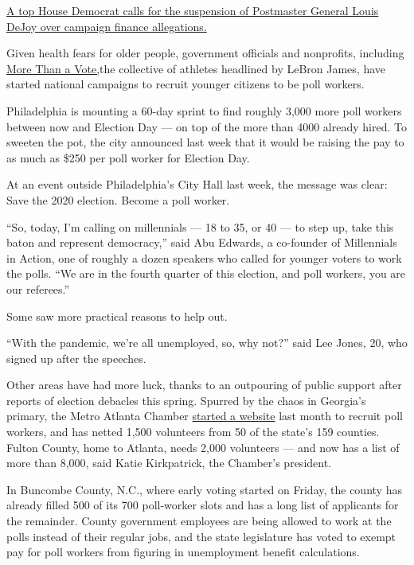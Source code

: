 \href{https://www.nytimes3xbfgragh.onion/live/2020/09/08/us/trump-vs-biden\#a-top-house-democrat-calls-for-the-suspension-of-postmaster-general-louis-dejoy-over-campaign-finance-allegations}{A
top House Democrat calls for the suspension of Postmaster General Louis
DeJoy over campaign finance allegations.}

Given health fears for older people, government officials and
nonprofits, including
\href{https://www.nytimes3xbfgragh.onion/2020/08/24/us/politics/lebron-james-poll-workers.html?searchResultPosition=9}{More
Than a Vote,}the collective of athletes headlined by LeBron James, have
started national campaigns to recruit younger citizens to be poll
workers.

Philadelphia is mounting a 60-day sprint to find roughly 3,000 more poll
workers between now and Election Day --- on top of the more than 4000
already hired. To sweeten the pot, the city announced last week that it
would be raising the pay to as much as \$250 per poll worker for
Election Day.

At an event outside Philadelphia's City Hall last week, the message was
clear: Save the 2020 election. Become a poll worker.

``So, today, I'm calling on millennials --- 18 to 35, or 40 --- to step
up, take this baton and represent democracy,'' said Abu Edwards, a
co-founder of Millennials in Action, one of roughly a dozen speakers who
called for younger voters to work the polls. ``We are in the fourth
quarter of this election, and poll workers, you are our referees.''

Some saw more practical reasons to help out.

``With the pandemic, we're all unemployed, so, why not?'' said Lee
Jones, 20, who signed up after the speeches.

Other areas have had more luck, thanks to an outpouring of public
support after reports of election debacles this spring. Spurred by the
chaos in Georgia's primary, the Metro Atlanta Chamber
\href{https://gapollworker.com}{started a website} last month to recruit
poll workers, and has netted 1,500 volunteers from 50 of the state's 159
counties. Fulton County, home to Atlanta, needs 2,000 volunteers --- and
now has a list of more than 8,000, said Katie Kirkpatrick, the Chamber's
president.

In Buncombe County, N.C., where early voting started on Friday, the
county has already filled 500 of its 700 poll-worker slots and has a
long list of applicants for the remainder. County government employees
are being allowed to work at the polls instead of their regular jobs,
and the state legislature has voted to exempt pay for poll workers from
figuring in unemployment benefit calculations.

